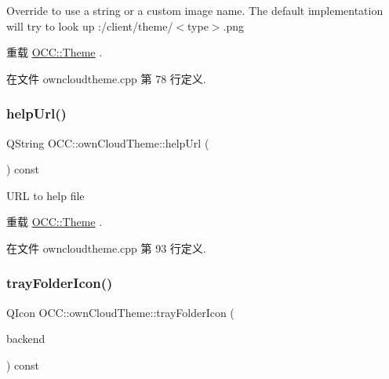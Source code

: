 Override to use a string or a custom image name. The default implementation will try to look up \+:/client/theme/$<$type$>$.png 

重载 \hyperlink{class_o_c_c_1_1_theme_ac248812f511fad2b02d376b451bba2ec}{O\+C\+C\+::\+Theme} .



在文件 owncloudtheme.\+cpp 第 78 行定义.

\mbox{\label{class_o_c_c_1_1own_cloud_theme_a30a50cd11d5c7a354ef47412741d96e4}} 
\subsubsection{\texorpdfstring{help\+Url()}{helpUrl()}}
{\footnotesize\ttfamily Q\+String O\+C\+C\+::own\+Cloud\+Theme\+::help\+Url (\begin{DoxyParamCaption}{ }\end{DoxyParamCaption}) const\hspace{0.3cm}{\ttfamily [virtual]}}

U\+RL to help file 

重载 \hyperlink{class_o_c_c_1_1_theme_aba73a024ee17d93542b7a129d4cea822}{O\+C\+C\+::\+Theme} .



在文件 owncloudtheme.\+cpp 第 93 行定义.

\mbox{\label{class_o_c_c_1_1own_cloud_theme_a1f64a30c0d6ecb85fb009a3d776b50c1}} 
\subsubsection{\texorpdfstring{tray\+Folder\+Icon()}{trayFolderIcon()}}
{\footnotesize\ttfamily Q\+Icon O\+C\+C\+::own\+Cloud\+Theme\+::tray\+Folder\+Icon (\begin{DoxyParamCaption}\item[{const Q\+String \&}]{backend }\end{DoxyParamCaption}) const\hspace{0.3cm}{\ttfamily [virtual]}}

